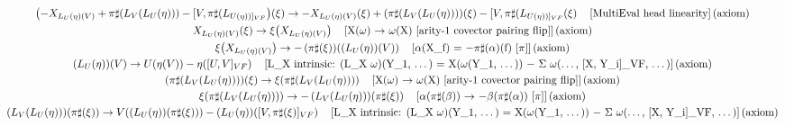 \documentclass[11pt]{article}
\begin{document}
{\begin{gather*}
\left(-X_{L_U(\eta)(V)} + \pi\sharp\!\left(L_V\!\left(L_U\!\left(\eta\right)\right)\right) - [V,\pi\sharp(L_{U(\eta))]_{VF}}\right)\!\left(\xi\right) \to -X_{L_U(\eta)(V)}\!\left(\xi\right) + \left(\pi\sharp\!\left(L_V\!\left(L_U\!\left(\eta\right)\right)\right)\right)\!\left(\xi\right) - [V,\pi\sharp(L_{U(\eta))]_{VF}}\!\left(\xi\right) \quad \text{[MultiEval head linearity]\,(axiom)} \\
X_{L_U(\eta)(V)}\!\left(\xi\right) \to \xi\!\left(X_{L_U(\eta)(V)}\right) \quad \text{[X(\ensuremath{\omega}) \ensuremath{\to} \ensuremath{\omega}(X)  [arity-1 covector pairing flip]]\,(axiom)} \\
\xi\!\left(X_{L_U(\eta)(V)}\right) \to -\left(\pi\sharp\!\left(\xi\right)\right)\!\left(\left(L_U\!\left(\eta\right)\right)\!\left(V\right)\right) \quad \text{[\ensuremath{\alpha}(X\_f) = \ensuremath{-}\ensuremath{\pi}\ensuremath{\sharp}(\ensuremath{\alpha})(f) [\ensuremath{\pi}]]\,(axiom)} \\
\left(L_U\!\left(\eta\right)\right)\!\left(V\right) \to U\!\left(\eta\!\left(V\right)\right) - \eta\!\left([U,V]_{VF}\right) \quad \text{[L\_X intrinsic: (L\_X \ensuremath{\omega})(Y\_1, \ensuremath{\dots}) = X(\ensuremath{\omega}(Y\_1, \ensuremath{\dots})) \ensuremath{-} \ensuremath{\Sigma} \ensuremath{\omega}(\ensuremath{\dots}, [X, Y\_i]\_VF, \ensuremath{\dots})]\,(axiom)} \\
\left(\pi\sharp\!\left(L_V\!\left(L_U\!\left(\eta\right)\right)\right)\right)\!\left(\xi\right) \to \xi\!\left(\pi\sharp\!\left(L_V\!\left(L_U\!\left(\eta\right)\right)\right)\right) \quad \text{[X(\ensuremath{\omega}) \ensuremath{\to} \ensuremath{\omega}(X)  [arity-1 covector pairing flip]]\,(axiom)} \\
\xi\!\left(\pi\sharp\!\left(L_V\!\left(L_U\!\left(\eta\right)\right)\right)\right) \to -\left(L_V\!\left(L_U\!\left(\eta\right)\right)\right)\!\left(\pi\sharp\!\left(\xi\right)\right) \quad \text{[\ensuremath{\alpha}(\ensuremath{\pi}\ensuremath{\sharp}(\ensuremath{\beta})) \ensuremath{\to} \ensuremath{-}\ensuremath{\beta}(\ensuremath{\pi}\ensuremath{\sharp}(\ensuremath{\alpha})) [\ensuremath{\pi}]]\,(axiom)} \\
\left(L_V\!\left(L_U\!\left(\eta\right)\right)\right)\!\left(\pi\sharp\!\left(\xi\right)\right) \to V\!\left(\left(L_U\!\left(\eta\right)\right)\!\left(\pi\sharp\!\left(\xi\right)\right)\right) - \left(L_U\!\left(\eta\right)\right)\!\left([V,\pi\sharp(\xi)]_{VF}\right) \quad \text{[L\_X intrinsic: (L\_X \ensuremath{\omega})(Y\_1, \ensuremath{\dots}) = X(\ensuremath{\omega}(Y\_1, \ensuremath{\dots})) \ensuremath{-} \ensuremath{\Sigma} \ensuremath{\omega}(\ensuremath{\dots}, [X, Y\_i]\_VF, \ensuremath{\dots})]\,(axiom)} \\

\end{gather*}}
\end{document}
